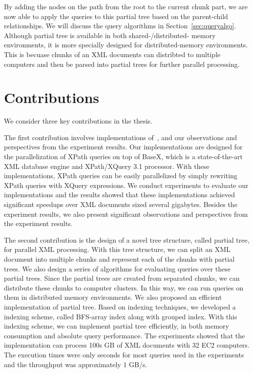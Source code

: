 By adding the nodes on the path from the root to the current chunk part, we are
now able to apply the queries to this partial tree based on the parent-child
relationships. We will discuss the query algorithms in
Section~\ref{sec:queryalgo}. Although partial tree is available in both
shared-/distributed- memory environments, it is more specially designed for
distributed-memory environments. This is becuase chunks of an XML documents can
distribted to multiple computers and then be parsed into partial trees for
further parallel processing.

\section{Contributions}

We consider three key contributions in the thesis.

The first contribution involves implementations of~\cite{BoLS09}, and our
observations and perspectives from the experiment results. Our implementations
are designed for the parallelization of XPath queries on top of BaseX, which is
a state-of-the-art XML database engine and XPath/XQuery 3.1 processor. With
these implementations, XPath queries can be easily parallelized by simply
rewriting XPath queries with XQuery expressions. We conduct experiments to
evaluate our implementations and the results showed that these implementations
achieved significant speedups over XML documents sized several gigabytes.
Besides the experiment results, we also present significant observations and
perspectives from the experiment results.

The second contribution is the design of a novel tree structure, called partial
tree, for parallel XML processing. With this tree structure, we can split an XML
document into multiple chunks and represent each of the chunks with partial
trees. We also design a series of algorithms for evaluating queries over these
partial trees. Since the partial trees are created from separated chunks, we can
distribute these chunks to computer clusters. In this way, we can run queries on
them in distributed memory environments. We also proposed an efficient
implementation of partial tree. Based on indexing techniques, we developed a
indexing scheme, called BFS-array index along with grouped index. With this
indexing scheme, we can implement partial tree efficiently, in both memory
consumption and absolute query performance. The experiments showed that the
implementation can process 100s GB of XML documents with 32 EC2 computers. The
execution times were only seconds for most queries used in the experiments and
the throughput was approximately 1 GB/s.

